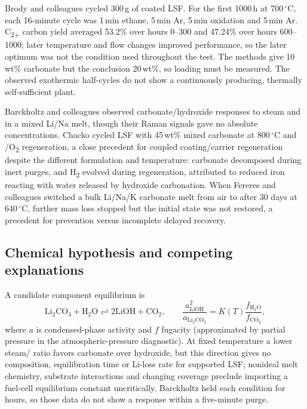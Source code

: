Brody and colleagues cycled 300\,g of coated LSF. For the first 1000\,h at 700\,$^\circ$C, each 16-minute cycle was 1\,min ethane, 5\,min Ar, 5\,min oxidation and 5\,min Ar. C\textsubscript{2+} carbon yield averaged 53.2\% over hours 0--300 and 47.24\% over hours 600--1000; later temperature and flow changes improved performance, so the later optimum was not the condition used throughout the test. The methods give 10\,wt\% carbonate but the conclusion 20\,wt\%, so loading must be measured. The observed exothermic half-cycles do not show a continuously producing, thermally self-sufficient plant.\cite{brody2022}

Barckholtz and colleagues observed carbonate/hydroxide responses to steam and \COtwo{} in a mixed Li/Na melt, though their Raman signals gave no absolute concentrations.\cite{barckholtz2021} Chacko cycled LSF with 45\,wt\% mixed carbonate at 800\,$^\circ$C and \COtwo{}/O\textsubscript{2} regeneration, a close precedent for coupled coating/carrier regeneration despite the different formulation and temperature: carbonate decomposed during inert purges, and H\textsubscript{2} evolved during regeneration, attributed to reduced iron reacting with water released by hydroxide carbonation.\cite[ch.~4.1]{chacko2025thesis} When Fereres and colleagues switched a bulk Li/Na/K carbonate melt from air to \COtwo{} after 30 days at 640\,$^\circ$C, further mass loss stopped but the initial state was not restored,\cite{fereres2018} a precedent for prevention versus incomplete delayed recovery.

\subsection{Chemical hypothesis and competing explanations}

A candidate component equilibrium is
\begin{equation}
 \mathrm{Li_2CO_3+H_2O\rightleftharpoons 2LiOH+CO_2},\qquad
 \frac{a_{\mathrm{LiOH}}^2}{a_{\mathrm{Li_2CO_3}}}
 =K(T)\frac{f_{\mathrm{H_2O}}}{f_{\mathrm{CO_2}}},
 \label{eq:cyclic-hydrolysis}
\end{equation}
where $a$ is condensed-phase activity and $f$ fugacity (approximated by partial pressure in the atmospheric-pressure diagnostic). At fixed temperature a lower steam/\COtwo{} ratio favors carbonate over hydroxide, but this direction gives no composition, equilibration time or Li-loss rate for supported LSF; nonideal melt chemistry, substrate interactions and changing coverage preclude importing a fuel-cell equilibrium constant uncritically. Barckholtz held each condition for hours, so those data do not show a response within a five-minute purge.\cite{barckholtz2021}

